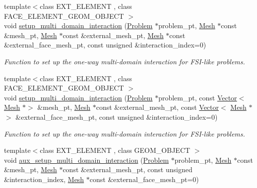 \begin{DoxyCompactItemize}
{\footnotesize template$<$class E\+X\+T\+\_\+\+E\+L\+E\+M\+E\+NT , class F\+A\+C\+E\+\_\+\+E\+L\+E\+M\+E\+N\+T\+\_\+\+G\+E\+O\+M\+\_\+\+O\+B\+J\+E\+CT $>$ }\\void \hyperlink{namespaceoomph_1_1Multi__domain__functions_a5fb45ad7165cc546b5e34e01a53478d8}{setup\+\_\+multi\+\_\+domain\+\_\+interaction} (\hyperlink{classoomph_1_1Problem}{Problem} $\ast$problem\+\_\+pt, \hyperlink{classoomph_1_1Mesh}{Mesh} $\ast$const \&mesh\+\_\+pt, \hyperlink{classoomph_1_1Mesh}{Mesh} $\ast$const \&external\+\_\+mesh\+\_\+pt, \hyperlink{classoomph_1_1Mesh}{Mesh} $\ast$const \&external\+\_\+face\+\_\+mesh\+\_\+pt, const unsigned \&interaction\+\_\+index=0)
\begin{DoxyCompactList}\small\item\em Function to set up the one-\/way multi-\/domain interaction for F\+S\+I-\/like problems. \end{DoxyCompactList}\item 
{\footnotesize template$<$class E\+X\+T\+\_\+\+E\+L\+E\+M\+E\+NT , class F\+A\+C\+E\+\_\+\+E\+L\+E\+M\+E\+N\+T\+\_\+\+G\+E\+O\+M\+\_\+\+O\+B\+J\+E\+CT $>$ }\\void \hyperlink{namespaceoomph_1_1Multi__domain__functions_abb2746a9c7ad6f5de84993e6284ef27b}{setup\+\_\+multi\+\_\+domain\+\_\+interaction} (\hyperlink{classoomph_1_1Problem}{Problem} $\ast$problem\+\_\+pt, const \hyperlink{classoomph_1_1Vector}{Vector}$<$ \hyperlink{classoomph_1_1Mesh}{Mesh} $\ast$$>$ \&mesh\+\_\+pt, \hyperlink{classoomph_1_1Mesh}{Mesh} $\ast$const \&external\+\_\+mesh\+\_\+pt, const \hyperlink{classoomph_1_1Vector}{Vector}$<$ \hyperlink{classoomph_1_1Mesh}{Mesh} $\ast$$>$ \&external\+\_\+face\+\_\+mesh\+\_\+pt, const unsigned \&interaction\+\_\+index=0)
\begin{DoxyCompactList}\small\item\em Function to set up the one-\/way multi-\/domain interaction for F\+S\+I-\/like problems. \end{DoxyCompactList}\item 
{\footnotesize template$<$class E\+X\+T\+\_\+\+E\+L\+E\+M\+E\+NT , class G\+E\+O\+M\+\_\+\+O\+B\+J\+E\+CT $>$ }\\void \hyperlink{namespaceoomph_1_1Multi__domain__functions_ae63441bb68e6512082f1248c65f6208d}{aux\+\_\+setup\+\_\+multi\+\_\+domain\+\_\+interaction} (\hyperlink{classoomph_1_1Problem}{Problem} $\ast$problem\+\_\+pt, \hyperlink{classoomph_1_1Mesh}{Mesh} $\ast$const \&mesh\+\_\+pt, \hyperlink{classoomph_1_1Mesh}{Mesh} $\ast$const \&external\+\_\+mesh\+\_\+pt, const unsigned \&interaction\+\_\+index, \hyperlink{classoomph_1_1Mesh}{Mesh} $\ast$const \&external\+\_\+face\+\_\+mesh\+\_\+pt=0)

\end{DoxyCompactItemize}
